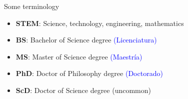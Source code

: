 \begin{frame}[fragile]{Some terminology}
\begin{itemize}
    \item {\bf STEM}: Science, technology, engineering, mathematics
    \item {\bf BS}: Bachelor of Science degree \textcolor{blue}{(Licenciatura)}
    \item {\bf MS}: Master of Science degree  \textcolor{blue}{(Maestr\'ia)}
    \item {\bf PhD}: Doctor of Philosophy degree \textcolor{blue}{(Doctorado)} 
    \item {\bf ScD}: Doctor of Science degree (uncommon)
\end{itemize}
\end{frame}

